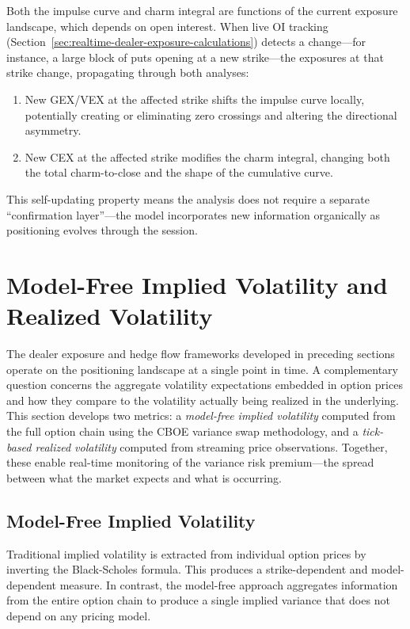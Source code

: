 \documentclass[11pt, a4paper]{article}
\begin{document}
Both the impulse curve and charm integral are functions of the current exposure landscape, which depends on open interest. When live OI tracking (Section~\ref{sec:realtime-dealer-exposure-calculations}) detects a change---for instance, a large block of puts opening at a new strike---the exposures at that strike change, propagating through both analyses:

\begin{enumerate}
    \item New GEX/VEX at the affected strike shifts the impulse curve locally, potentially creating or eliminating zero crossings and altering the directional asymmetry.
    \item New CEX at the affected strike modifies the charm integral, changing both the total charm-to-close and the shape of the cumulative curve.
\end{enumerate}

This self-updating property means the analysis does not require a separate ``confirmation layer''---the model incorporates new information organically as positioning evolves through the session.



\section{Model-Free Implied Volatility and Realized Volatility}
\label{sec:iv-rv}

The dealer exposure and hedge flow frameworks developed in preceding sections operate on the positioning landscape at a single point in time. A complementary question concerns the aggregate volatility expectations embedded in option prices and how they compare to the volatility actually being realized in the underlying. This section develops two metrics: a \emph{model-free implied volatility} computed from the full option chain using the CBOE variance swap methodology, and a \emph{tick-based realized volatility} computed from streaming price observations. Together, these enable real-time monitoring of the variance risk premium---the spread between what the market expects and what is occurring.

\subsection{Model-Free Implied Volatility}

Traditional implied volatility is extracted from individual option prices by inverting the Black-Scholes formula. This produces a strike-dependent and model-dependent measure. In contrast, the model-free approach aggregates information from the entire option chain to produce a single implied variance that does not depend on any pricing model.
\end{document}
